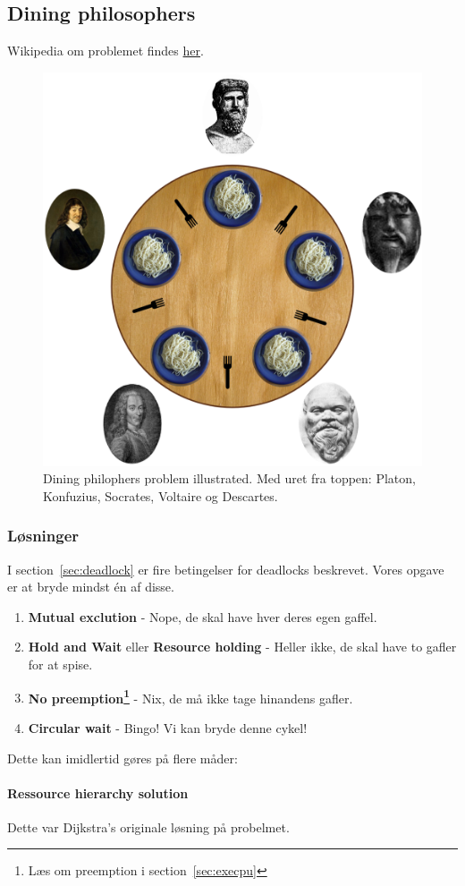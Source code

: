 \subsection{Dining philosophers}
Wikipedia om problemet findes \href{https://en.wikipedia.org/wiki/Dining_philosophers_problem}{her}.

\begin{figure}[h]
	\centering
	\includegraphics[width=0.5\linewidth]{figs/spm2/dining}
	\caption{Dining philophers problem illustrated. Med uret fra toppen: Platon, Konfuzius, Socrates, Voltaire og Descartes.}
	\label{fig:dining}
\end{figure}

\subsubsection{Løsninger}
I section~\ref{sec:deadlock} er fire betingelser for deadlocks beskrevet. Vores opgave er at bryde mindst én af disse.

\begin{enumerate}
	\item \textbf{Mutual exclution} - Nope, de skal have hver deres egen gaffel.
	\item \textbf{Hold and Wait} eller \textbf{Resource holding} - Heller ikke, de skal have to gafler for at spise.
	\item \textbf{No preemption\footnote{Læs om preemption i section~\ref{sec:execpu}}} - Nix, de må ikke tage hinandens gafler.
	\item \textbf{Circular wait} - Bingo! Vi kan bryde denne cykel!
\end{enumerate}

Dette kan imidlertid gøres på flere måder:

\paragraph{Ressource hierarchy solution}
Dette var Dijkstra's originale løsning på probelmet.

